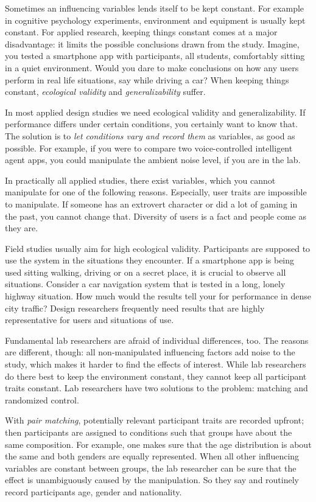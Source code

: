 \documentclass[]{svmono}
\theoremstyle{definition}
\theoremstyle{definition}
\theoremstyle{definition}
\theoremstyle{remark}
\begin{document}
Sometimes an influencing variables lends itself to be kept constant. For
example in cognitive psychology experiments, environment and equipment
is usually kept constant. For applied research, keeping things constant
comes at a major disadvantage: it limits the possible conclusions drawn
from the study. Imagine, you tested a smartphone app with participants,
all students, comfortably sitting in a quiet environment. Would you dare
to make conclusions on how any users perform in real life situations,
say while driving a car? When keeping things constant, \emph{ecological
validity} and \emph{generalizability} suffer.

In most applied design studies we need ecological validity and
generalizability. If performance differs under certain conditions, you
certainly want to know that. The solution is to \emph{let conditions
vary and record them} as variables, as good as possible. For example, if
you were to compare two voice-controlled intelligent agent apps, you
could manipulate the ambient noise level, if you are in the lab.

In practically all applied studies, there exist variables, which you
cannot manipulate for one of the following reasons. Especially, user
traits are impossible to manipulate. If someone has an extrovert
character or did a lot of gaming in the past, you cannot change that.
Diversity of users is a fact and people come as they are.

Field studies usually aim for high ecological validity. Participants are
supposed to use the system in the situations they encounter. If a
smartphone app is being used sitting walking, driving or on a secret
place, it is crucial to observe all situations. Consider a car
navigation system that is tested in a long, lonely highway situation.
How much would the results tell your for performance in dense city
traffic? Design researchers frequently need results that are highly
representative for users and situations of use.

Fundamental lab researchers are afraid of individual differences, too.
The reasons are different, though: all non-manipulated influencing
factors add noise to the study, which makes it harder to find the
effects of interest. While lab researchers do there best to keep the
environment constant, they cannot keep all participant traits constant.
Lab researchers have two solutions to the problem: matching and
randomized control.

With \emph{pair matching}, potentially relevant participant traits are
recorded upfront; then participants are assigned to conditions such that
groups have about the same composition. For example, one makes sure that
the age distribution is about the same and both genders are equally
represented. When all other influencing variables are constant between
groups, the lab researcher can be sure that the effect is unambiguously
caused by the manipulation. So they say and routinely record
participants age, gender and nationality.
\end{document}
